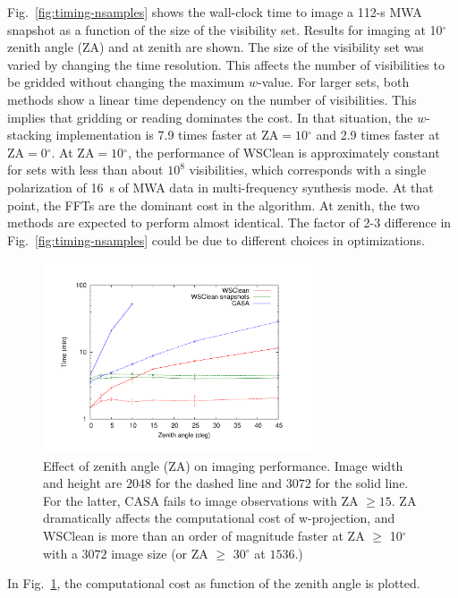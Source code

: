 \documentclass[useAMS,usenatbib]{mn2e}
\newcommand{\degree}{\ensuremath{^{\circ}}\xspace}
\begin{document}
Fig.~\ref{fig:timing-nsamples} shows the wall-clock time to image a 112-s MWA snapshot as a function of the size of the visibility set. Results for imaging at 10\degree zenith angle (ZA) and at zenith are shown. The size of the visibility set was varied by changing the time resolution. This affects the number of visibilities to be gridded without changing the maximum $w$-value. For larger sets, both methods show a linear time dependency on the number of visibilities. This implies that gridding or reading dominates the cost. In that situation, the $w$-stacking implementation is 7.9 times faster at $\textrm{ZA}=10\degree$ and 2.9 times faster at $\textrm{ZA}=0\degree$. At $\textrm{ZA}=10$\degree, the performance of WSClean is approximately constant for sets with less than about $10^8$ visibilities, which corresponds with a single polarization of 16~s of MWA data in multi-frequency synthesis mode. At that point, the FFTs are the dominant cost in the algorithm. At zenith, the two methods are expected to perform almost identical. The factor of 2-3 difference in Fig.~\ref{fig:timing-nsamples} could be due to different choices in optimizations.

\begin{figure}
\begin{center}
\includegraphics[width=8cm]{img/benchmark-zenith-angle/za}
\caption{Effect of zenith angle (ZA) on imaging performance. Image width and height are $2048$ for the dashed line and $3072$ for the solid line. For the latter, CASA fails to image observations with ZA $\ge 15$. ZA dramatically affects the computational cost of w-projection, and WSClean is more than an order of magnitude faster at ZA $\ge$ 10\degree with a $3072$ image size (or ZA $\ge$ 30\degree at $1536$.) }
\label{fig:timing-zenith-angle}
\end{center}
\end{figure}

In Fig.~\ref{fig:timing-zenith-angle}, the computational cost as function of the zenith angle is plotted. 
\end{document}
